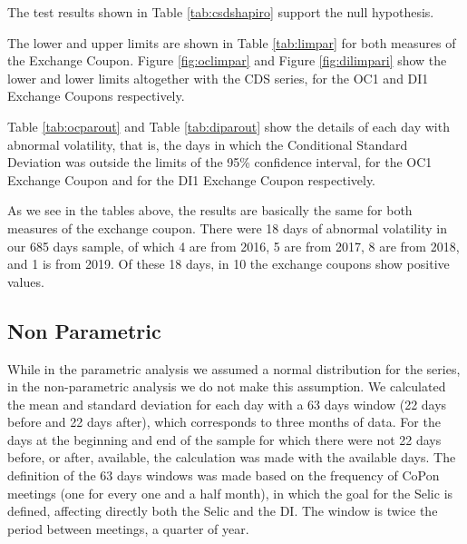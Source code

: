 \documentclass[cic,tc, english]{iiufrgs}
\begin{document}
    

    The test results shown in Table \ref{tab:csdshapiro} support the null hypothesis.

    The lower and upper limits are shown in Table \ref{tab:limpar} for both measures of the Exchange Coupon. Figure \ref{fig:oclimpar} and Figure \ref{fig:dilimpari} show the lower and lower limits altogether with the CDS series, for the OC1 and DI1 Exchange Coupons respectively.

    

    

    

    Table \ref{tab:ocparout} and Table \ref{tab:diparout} show the details of each day with abnormal volatility, that is, the days in which the Conditional Standard Deviation was outside the limits of the 95\% confidence interval, for the OC1 Exchange Coupon and for the DI1 Exchange Coupon respectively.

    

    

    As we see in the tables above, the results are basically the same for both measures of the exchange coupon. There were 18 days of abnormal volatility in our 685 days sample, of which 4 are from 2016, 5 are from 2017, 8 are from 2018, and 1 is from 2019. Of these 18 days, in 10 the exchange coupons show positive values.


\subsection{Non Parametric}

    While in the parametric analysis we assumed a normal distribution for the series, in the non-parametric analysis we do not make this assumption. We calculated the mean and standard deviation for each day with a 63 days window (22 days before and 22 days after), which corresponds to three months of data. For the days at the beginning and end of the sample for which there were not 22 days before, or after, available, the calculation was made with the available days. The definition of the 63 days windows was made based on the frequency of CoPon meetings (one for every one and a half month), in which the goal for the Selic is defined, affecting directly both the Selic and the DI. The window is twice the period between meetings, a quarter of year.
\end{document}
